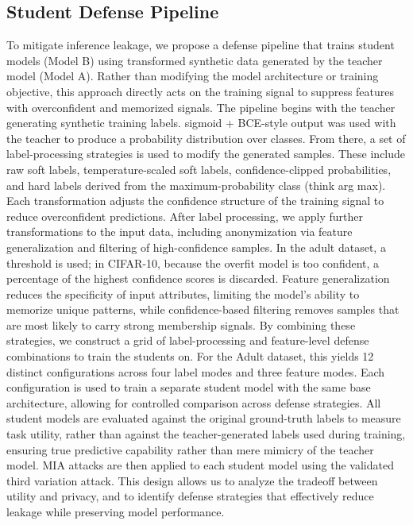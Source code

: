 \documentclass[conference]{IEEEtran}
\begin{document}
\subsection{Student Defense Pipeline}
To mitigate inference leakage, we propose a defense pipeline that trains student models (Model B) using transformed synthetic data generated by the teacher model (Model A). Rather than modifying the model architecture or training objective, this approach directly acts on the training signal to suppress features with overconfident and memorized signals.
The pipeline begins with the teacher generating synthetic training labels. sigmoid + BCE-style output was used with the teacher to produce a probability distribution over classes. From there, a set of label-processing strategies is used to modify the generated samples. These include raw soft labels, temperature-scaled soft labels, confidence-clipped probabilities, and hard labels derived from the maximum-probability class (think arg max). Each transformation adjusts the confidence structure of the training signal to reduce overconfident predictions.
After label processing, we apply further transformations to the input data, including anonymization via feature generalization and filtering of high-confidence samples. In the adult dataset, a threshold is used; in CIFAR-10, because the overfit model is too confident, a percentage of the highest confidence scores is discarded. Feature generalization reduces the specificity of input attributes, limiting the model’s ability to memorize unique patterns, while confidence-based filtering removes samples that are most likely to carry strong membership signals.
By combining these strategies, we construct a grid of label-processing and feature-level defense combinations to train the students on. For the Adult dataset, this yields 12 distinct configurations across four label modes and three feature modes. Each configuration is used to train a separate student model with the same base architecture, allowing for controlled comparison across defense strategies.
All student models are evaluated against the original ground-truth labels to measure task utility, rather than against the teacher-generated labels used during training, ensuring true predictive capability rather than mere mimicry of the teacher model. MIA attacks are then applied to each student model using the validated third variation attack.
This design allows us to analyze the tradeoff between utility and privacy, and to identify defense strategies that effectively reduce leakage while preserving model performance.
\end{document}
